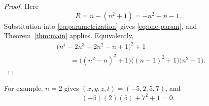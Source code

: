 \documentclass[11pt]{article}
\theoremstyle{remark}
\begin{document}
\begin{proof}
Here
\[
R=n-(n^2+1)=-n^2+n-1.
\]
Substitution into \eqref{eq:parametrization} gives
\eqref{eq:one-param}, and Theorem~\ref{thm:main} applies.  Equivalently,
\begin{align*}
&\bigl(n^4-2n^3+2n^2-n+1\bigr)^2+1\\
&\qquad={}
\bigl((n^2-n)^2+1\bigr)
\bigl((n-1)^2+1\bigr)
\bigl(n^2+1\bigr).
\end{align*}
\end{proof}

For example, $n=2$ gives $(x,y,z,t)=(-5,2,5,7)$, and
\[
(-5)(2)(5)+7^2+1=0.
\]
\end{document}

